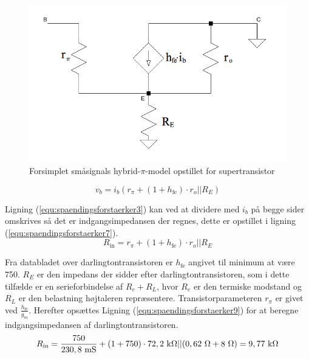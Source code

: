 \begin{figure}[h]
\centering
\includegraphics[scale=0.3]{teknisk/effektforstaerker/hybridpimodel.png}
\caption{Forsimplet småsignals hybrid-$\pi$-model  opstillet for supertransistor}
\label{hybridpimodel_darlington}
\end{figure}
\begin{equation}
\label{equ:spaendingsforstaerker6}
v_b = i_b (r_{\pi} + (1+h_{\mathrm{fe}}) \cdot r_o||R_E) 
\end{equation}

Ligning (\ref{equ:spaendingsforstaerker3}) kan ved at dividere med $i_b$ på begge sider omskrives så det er indgangsimpedansen der regnes, dette er opstillet i ligning (\ref{equ:spaendingsforstaerker7}).
\begin{equation}
\label{equ:spaendingsforstaerker7}
R_{\mathrm{in}} = r_{\pi} + (1+h_{\mathrm{fe}}) \cdot r_o||R_E 
\end{equation}

Fra databladet over darlingtontransistoren er $h_{\mathrm{fe}}$ angivet til minimum at være 750.  $R_E$ er den impedans der sidder efter darlingtontransistoren, som i dette tilfælde er en serieforbindelse af $R_e + R_L$, hvor $R_e$ er den termiske modstand og $R_L$ er den belastning højtaleren repræsentere. Transistorparameteren $r_{\pi}$ er givet ved $\frac{h_{\mathrm{fe}}}{g_m}$. Herefter opsættes Ligning (\ref{equ:spaendingsforstaerker9}) for at beregne indgangsimpedansen af darlingtontransistoren.
\begin{equation}
\label{equ:spaendingsforstaerker9}
R_{\mathrm{in}} = \frac{750}{230,8~\mathrm{mS}} + ( 1 + 750 ) \cdot 72,2~\mathrm{k}\ohm || (0,62~\ohm + 8~\ohm) = 9,77~\mathrm{k}\ohm  
\end{equation}

